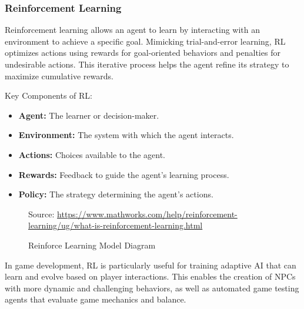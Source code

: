\documentclass[12pt,oneside,openright,a4paper]{cpe-english-project}
\begin{document}
\subsubsection{Reinforcement Learning}
Reinforcement learning\cite{mathworks_rl} allows an agent to learn by interacting with an environment to achieve a specific goal. Mimicking trial-and-error learning, RL optimizes actions using rewards for goal-oriented behaviors and penalties for undesirable actions. This iterative process helps the agent refine its strategy to maximize cumulative rewards.

Key Components of RL:
\begin{itemize}
\item  \textbf{Agent:} The learner or decision-maker.
\item  \textbf{Environment:} The system with which the agent interacts.
\item  \textbf{Actions:} Choices available to the agent.
\item  \textbf{Rewards:} Feedback to guide the agent's learning process.
\item  \textbf{Policy:} The strategy determining the agent's actions.
\end{itemize}
\begin{figure}[H]
\centering
{}
\caption{Reinforce Learning Model Diagram}\label{fig:ReinforceModelDia}
Source:
\href{https://www.mathworks.com/help/reinforcement-learning/ug/what-is-reinforcement-learning.html} {https://www.mathworks.com/help/reinforcement-learning/ug/what-is-reinforcement-learning.html}
\end{figure}
In game development, RL is particularly useful for training adaptive AI that can learn and evolve based on player interactions. This enables the creation of NPCs with more dynamic and challenging behaviors, as well as automated game testing agents that evaluate game mechanics and balance.
\end{document}
